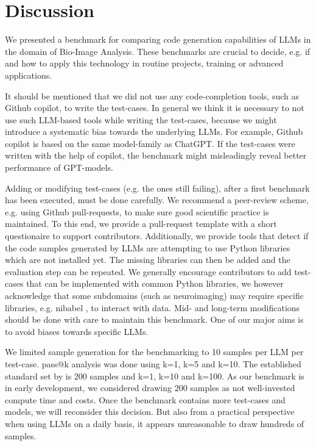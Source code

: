\documentclass{ecai}
\begin{document}

\section{Discussion}

We presented a benchmark for comparing code generation capabilities of LLMs in the domain of Bio-Image Analysis. These benchmarks are crucial to decide, e.g. if and how to apply this technology in routine projects, training or advanced applications. 

It should be mentioned that we did not use any code-completion tools, such as Github copilot, to write the test-cases. In general we think it is necessary to not use such LLM-based tools while writing the test-cases, because we might introduce a systematic bias towards the underlying LLMs. For example, Github copilot is based on the same model-family as ChatGPT. If the test-cases were written with the help of copilot, the benchmark might misleadingly reveal better performance of GPT-models.

Adding or modifying test-cases (e.g. the ones still failing), after a first benchmark has been executed, must be done carefully. We recommend a peer-review scheme, e.g. using Github pull-requests, to make sure good scientific practice is maintained. To this end, we provide a pull-request template with a short questionaire to support contributors. Additionally, we provide tools that detect if the code samples generated by LLMs are attempting to use Python libraries which are not installed yet. The missing libraries can then be added and the evaluation step can be repeated. We generally encourage contributors to add test-cases that can be implemented with common Python libraries, we however acknowledge that some subdomains (such as neuroimaging) may require specific libraries, e.g. nibabel \citep{brett_2024_10714563}, to interact with data. Mid- and long-term modifications should be done with care to maintain this benchmark. One of our major aims is to avoid biases towards specific LLMs.

We limited sample generation for the benchmarking to 10 samples per LLM per test-case. pass@k analysis was done using k=1, k=5 and k=10. The established standard set by \citep{chen2021evaluating} is 200 samples and k=1, k=10 and k=100. As our benchmark is in early development, we considered drawing 200 samples as not well-invested compute time and costs. Once the benchmark contains more test-cases and models, we will reconsider this decision. But also from a practical perspective when using LLMs on a daily basis, it appears unreasonable to draw hundreds of samples.
\end{document}
